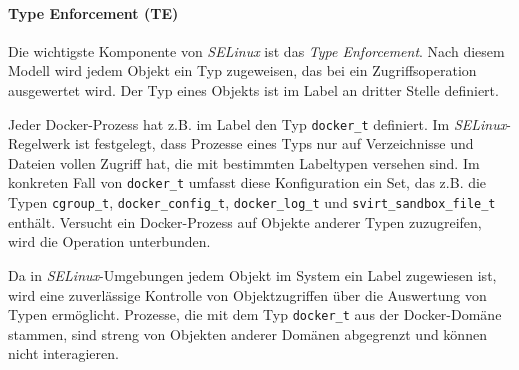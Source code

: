 \documentclass[../main.tex]{subfiles}
\begin{document}



				\paragraph{Type Enforcement (TE)}
					Die wichtigste Komponente von \emph{SELinux} ist das \emph{Type Enforcement}. Nach diesem Modell wird jedem Objekt ein Typ zugeweisen, das bei ein Zugriffsoperation ausgewertet wird. Der Typ eines Objekts ist im Label an dritter Stelle definiert.

					Jeder Docker-Prozess hat z.B. im Label den Typ \texttt{docker\_t} definiert. Im \emph{SELinux}-Regelwerk ist festgelegt, dass Prozesse eines Typs nur auf Verzeichnisse und Dateien vollen Zugriff hat, die mit bestimmten Labeltypen versehen sind. Im konkreten Fall von \texttt{docker\_t} umfasst diese Konfiguration ein Set, das z.B. die Typen \texttt{cgroup\_t}, \texttt{docker\_config\_t}, \texttt{docker\_log\_t} und \texttt{svirt\_sandbox\_file\_t} enthält. Versucht ein Docker-Prozess auf Objekte anderer Typen zuzugreifen, wird die Operation unterbunden.

					Da in \emph{SELinux}-Umgebungen jedem Objekt im System ein Label zugewiesen ist, wird eine zuverlässige Kontrolle von Objektzugriffen über die Auswertung von Typen ermöglicht. Prozesse, die mit dem Typ \texttt{docker\_t} aus der Docker-Domäne stammen, sind streng von Objekten anderer Domänen abgegrenzt und können nicht interagieren.
\end{document}
